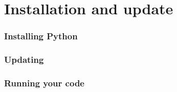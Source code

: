 \section{Installation and update}

\begin{frame}
\frametitle{Installing Python}

\end{frame}

\begin{frame}
\frametitle{Updating}

\end{frame}

\begin{frame}
\frametitle{Running your code}



\end{frame}


